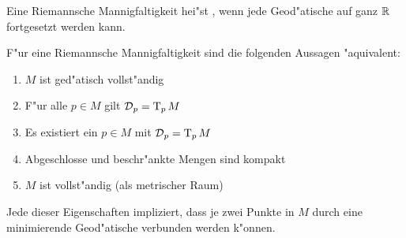 \begin{Dfn}
Eine Riemannsche Mannigfaltigkeit hei"st , wenn jede Geod"atische auf ganz $\operatorname{\mathbb{R}}$ fortgesetzt werden kann.
\end{Dfn}

\begin{Satz}
F"ur eine Riemannsche Mannigfaltigkeit sind die folgenden Aussagen "aquivalent:
\begin{enumerate}[label=(\roman*)]
\item
	$M$ ist ged"atisch vollst"andig
\item
	F"ur alle $p \in M$ gilt $\operatorname{\mathcal{D}}_p = \operatorname{T}_pM$
\item
	Es existiert ein $p \in M$ mit $\operatorname{\mathcal{D}}_p = \operatorname{T}_pM$
\item
	Abgeschlosse und beschr"ankte Mengen sind kompakt
\item
	$M$ ist vollst"andig (als metrischer Raum)
\end{enumerate}
Jede dieser Eigenschaften impliziert, dass je zwei Punkte in $M$ durch eine minimierende Geod"atische verbunden werden k"onnen.
\end{Satz}

